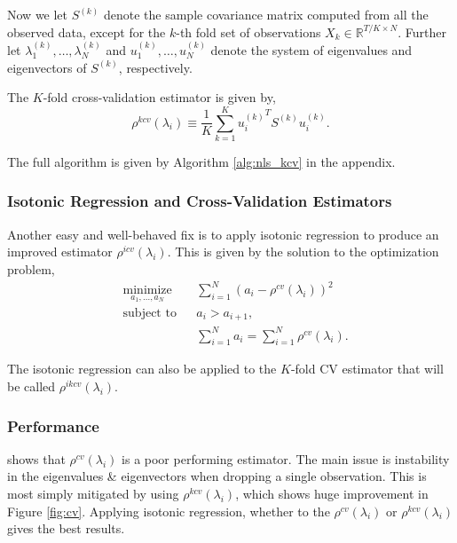 \documentclass{article}
\begin{document}
Now we let $S^{(k)}$ denote the sample covariance matrix computed from all the
observed data, except for the $k$-th fold set of observations $X_k \in
\mathbb{R}^{T/K \times N}$.  Further let $\lambda_1^{(k)}, \ldots,
\lambda_N^{(k)}$ and $u_1^{(k)}, \ldots, u_N^{(k)}$ denote the system of
eigenvalues and eigenvectors of $S^{(k)}$, respectively.

The $K$-fold cross-validation estimator is given by,
\begin{equation}\label{eq:rho_kcv}
	\rho^{kcv}(\lambda_i) 
		\equiv \frac1K \sum_{k=1}^K {u_i^{(k)}}^T S^{(k)} u_i^{(k)}.
\end{equation}

The full algorithm is given by Algorithm \ref{alg:nls_kcv} in the appendix.


\subsubsection{Isotonic Regression and Cross-Validation Estimators}\label{sec:icv}

Another easy and well-behaved fix is to apply isotonic regression to produce an
improved estimator $\rho^{icv}(\lambda_i)$.   This is given by the solution to
the optimization problem,
\begin{equation*}
  \begin{aligned}
    & \underset{a_1, \ldots, a_N}{\text{minimize}}
    & & \sum_{i=1}^N (a_i - \rho^{cv}(\lambda_i))^2 \\
    & \text{subject to}
    & & a_i > a_{i+1},\\
    & & & \sum_{i=1}^N a_i = \sum_{i=1}^N \rho^{cv}(\lambda_i).
  \end{aligned}
\end{equation*}


The isotonic regression can also be applied to the $K$-fold CV estimator that
will be called $\rho^{ikcv}(\lambda_i)$.

\subsubsection{Performance}

\cite{Bartz2016CrossValidation} shows that $\rho^{cv}(\lambda_i)$ is a poor
performing estimator.  The main issue is instability in the eigenvalues \&
eigenvectors when dropping a single observation.  This is most simply mitigated
by using $\rho^{kcv}(\lambda_i)$, which shows huge improvement in Figure
\ref{fig:cv}. Applying isotonic regression, whether to the
$\rho^{cv}(\lambda_i)$ or $\rho^{kcv}(\lambda_i)$ gives the best results.
\end{document}
